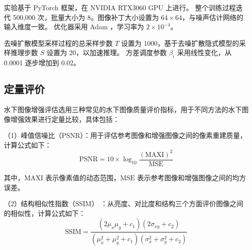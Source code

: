 \begin{table}[ht]
	\vspace{-0.4mm}
	\centering
	\caption{\label{tab:dataset-split}数据集划分（成对图像）。}
	\vspace{-2mm}
	\vspace{-1mm}
\end{table}   

实验基于 PyTorch 框架，在 NVIDIA RTX3060 GPU 上进行。
整个训练过程迭代 500,000 次，批量大小为 8。图像补丁大小设置为 $64 \times 64$，与噪声估计网络的输入维度一致。
优化器采用 Adam \cite{kingma2017adam}，学习率为 $2 \times 10^{-4}$。

去噪扩散模型采样过程的总采样步数 $T$ 设置为 1000，基于去噪扩散隐式模型的采样推理步数 $S$ 设置为 20，以加速推理。
方差调度参数 $\beta_i$ 采用线性变化，从 0.0001 逐步增加到 0.02。

\subsection{定量评价} \label{sec:quantitative}
水下图像增强评估选用三种常见的水下图像质量评价指标，用于不同方法的水下图像增强效果进行定量比较，具体包括：

（1）峰值信噪比（PSNR）：用于评估参考图像和增强图像之间的像素重建质量，计算公式如下：
\begin{equation}
    \mathrm{PSNR} =10 \times \log _{10} \frac{(\mathrm{MAXI})^2}{\mathrm{MSE}}
\end{equation}

其中，$\mathrm{MAXI}$ 表示像素值的动态范围，$\mathrm{MSE}$ 表示参考图像和增强图像之间的均方误差。

（2）结构相似性指数（SSIM） \cite{ssim}：从亮度、对比度和结构三个方面评价图像之间的相似性，计算公式如下：
\begin{equation}
    \mathrm{SSIM} = \frac{{(2\mu_x\mu_y + c_1)(2\sigma_{xy} + c_2)}}{{(\mu_x^2 + \mu_y^2 + c_1)(\sigma_x^2 + \sigma_y^2 + c_2)}}
\end{equation}

